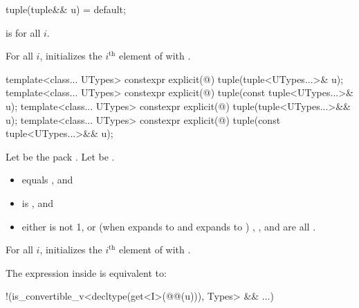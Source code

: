 \documentclass{wg21}
\begin{document}
%
\begin{itemdecl}
    tuple(tuple&& u) = default;
\end{itemdecl}

\begin{itemdescr}
    \pnum
    \constraints
     is  for all $i$.

    \pnum
    \effects
    For all $i$, initializes the $i^\text{th}$ element of  with
    .
\end{itemdescr}

%
\begin{itemdecl}
    template<class... UTypes> constexpr explicit(@\seebelow@) tuple(tuple<UTypes...>& u);
    template<class... UTypes> constexpr explicit(@\seebelow@) tuple(const tuple<UTypes...>& u);
    template<class... UTypes> constexpr explicit(@\seebelow@) tuple(tuple<UTypes...>&& u);
    template<class... UTypes> constexpr explicit(@\seebelow@) tuple(const tuple<UTypes...>&& u);
\end{itemdecl}

\begin{itemdescr}
    \pnum
    Let  be the pack .\newline
    Let  be .

    \pnum
    \constraints
    \begin{itemize}
        \item
         equals , and
        \item
        is , and
        \item
        either  is not 1, or
        (when  expands to  and
         expands to )
        ,
        , and
         are all .
    \end{itemize}

    \pnum
    \effects
    For all $i$, initializes the $i^\textrm{th}$ element of 
    with .

    \pnum
    \remarks
    The expression inside  is equivalent to:
    \begin{codeblock}
        !(is_convertible_v<decltype(get<I>(@@(u))), Types> && ...)
    \end{codeblock}
\end{itemdescr}
\end{document}

